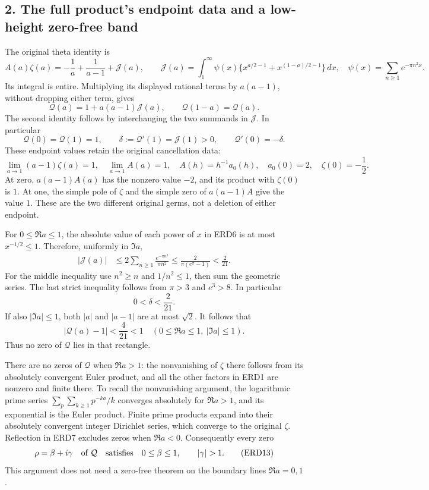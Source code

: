 \documentclass[
  10pt,
  a4paper,
]{article}
\begin{document}
\subsection{2. The full product's endpoint data and a low-height
zero-free
band}\label{the-full-products-endpoint-data-and-a-low-height-zero-free-band}

The original theta identity is \[
 A(a)\zeta(a)
 =-\frac1a+\frac1{a-1}
       +\mathcal J(a),\qquad
 \mathcal J(a)=\int_1^\infty
       \psi(x)\{x^{a/2-1}+x^{(1-a)/2-1}\}\,dx,
 \quad \psi(x)=\sum_{n\ge1}e^{-\pi n^2x}.
 \tag{ERD6}
\] Its integral is entire. Multiplying its displayed rational terms by
\(a(a-1)\), without dropping either term, gives \[
 \mathcal Q(a)=1+a(a-1)\mathcal J(a),\qquad
 \mathcal Q(1-a)=\mathcal Q(a).
 \tag{ERD7}
\] The second identity follows by interchanging the two summands in
\(\mathcal J\). In particular \[
 \mathcal Q(0)=\mathcal Q(1)=1,\qquad
 \delta:=\mathcal Q'(1)=\mathcal J(1)>0,\qquad
 \mathcal Q'(0)=-\delta.
 \tag{ERD8}
\] These endpoint values retain the original cancellation data: \[
 \lim_{a\to1}(a-1)\zeta(a)=1,\quad
 \lim_{a\to1}A(a)=1,\quad
 A(h)=h^{-1}a_0(h),\quad a_0(0)=2,\quad
 \zeta(0)=-\frac12.
 \tag{ERD9}
\] At zero, \(a(a-1)A(a)\) has the nonzero value \(-2\), and its product
with \(\zeta(0)\) is \(1\). At one, the simple pole of \(\zeta\) and the
simple zero of \(a(a-1)A\) give the value \(1\). These are the two
different original germs, not a deletion of either endpoint.

For \(0\le\Re a\le1\), the absolute value of each power of \(x\) in ERD6
is at most \(x^{-1/2}\le1\). Therefore, uniformly in \(\Im a\), \[
 \begin{aligned}
 |\mathcal J(a)|
 &\le2\sum_{n\ge1}
            \frac{e^{-\pi n^2}}{\pi n^2}
 \le\frac2{\pi(e^\pi-1)}
 <\frac2{21}.
 \end{aligned}
 \tag{ERD10}
\] For the middle inequality use \(n^2\ge n\) and \(1/n^2\le1\), then
sum the geometric series. The last strict inequality follows from
\(\pi>3\) and \(e^3>8\). In particular \[
 0<\delta<\frac2{21}.
 \tag{ERD11}
\] If also \(|\Im a|\le1\), both \(|a|\) and \(|a-1|\) are at most
\(\sqrt2\). It follows that \[
 |\mathcal Q(a)-1|<\frac4{21}<1
       \quad(0\le\Re a\le1,\ |\Im a|\le1).
 \tag{ERD12}
\] Thus no zero of \(\mathcal Q\) lies in that rectangle.

There are no zeros of \(\mathcal Q\) when \(\Re a>1\): the nonvanishing
of \(\zeta\) there follows from its absolutely convergent Euler product,
and all the other factors in ERD1 are nonzero and finite there. To
recall the nonvanishing argument, the logarithmic prime series
\(\sum_p\sum_{k\ge1}p^{-ka}/k\) converges absolutely for \(\Re a>1\),
and its exponential is the Euler product. Finite prime products expand
into their absolutely convergent integer Dirichlet series, which
converge to the original \(\zeta\). Reflection in ERD7 excludes zeros
when \(\Re a<0\). Consequently every zero \[
 \rho=\beta+i\gamma\quad\hbox{of }\mathcal Q
 \quad\hbox{satisfies}\quad
 0\le\beta\le1,\qquad |\gamma|>1.
 \tag{ERD13}
\] This argument does not need a zero-free theorem on the boundary lines
\(\Re a=0,1\).
\end{document}
